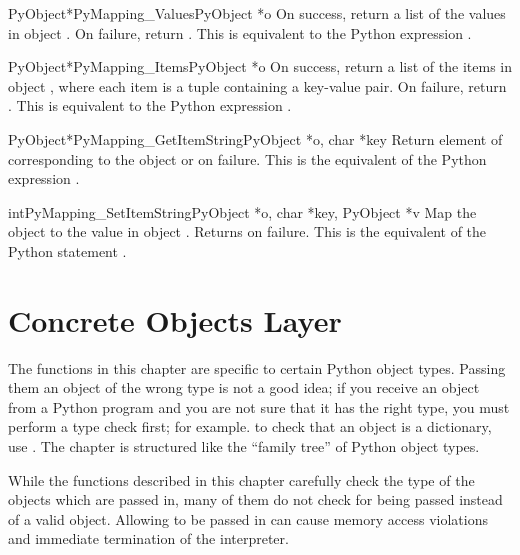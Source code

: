 \documentclass{manual}
\begin{document}
\begin{cfuncdesc}{PyObject*}{PyMapping_Values}{PyObject *o}
On success, return a list of the values in object .  On
failure, return \NULL{}. This is equivalent to the Python
expression .
\end{cfuncdesc}


\begin{cfuncdesc}{PyObject*}{PyMapping_Items}{PyObject *o}
On success, return a list of the items in object , where
each item is a tuple containing a key-value pair.  On
failure, return \NULL{}. This is equivalent to the Python
expression .
\end{cfuncdesc}


\begin{cfuncdesc}{PyObject*}{PyMapping_GetItemString}{PyObject *o, char *key}
Return element of  corresponding to the object  or
\NULL{} on failure. This is the equivalent of the Python expression
.
\end{cfuncdesc}

\begin{cfuncdesc}{int}{PyMapping_SetItemString}{PyObject *o, char *key, PyObject *v}
Map the object  to the value  in object .
Returns  on failure.  This is the equivalent of the Python
statement .
\end{cfuncdesc}


\chapter{Concrete Objects Layer \label{concrete}}

The functions in this chapter are specific to certain Python object
types.  Passing them an object of the wrong type is not a good idea;
if you receive an object from a Python program and you are not sure
that it has the right type, you must perform a type check first;
for example. to check that an object is a dictionary, use
.  The chapter is structured like the
``family tree'' of Python object types.

While the functions described in this chapter carefully check the type
of the objects which are passed in, many of them do not check for
\NULL{} being passed instead of a valid object.  Allowing \NULL{} to
be passed in can cause memory access violations and immediate
termination of the interpreter.
\end{document}
